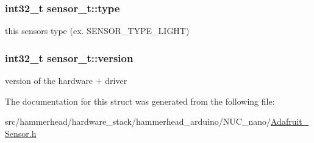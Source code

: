 \subsubsection[{\texorpdfstring{type}{type}}]{\setlength{\rightskip}{0pt plus 5cm}int32\+\_\+t sensor\+\_\+t\+::type}\hypertarget{structsensor__t_ae1d59df64438923d3bd95f2416c32203}{}\label{structsensor__t_ae1d59df64438923d3bd95f2416c32203}
this sensor\textquotesingle{}s type (ex. S\+E\+N\+S\+O\+R\+\_\+\+T\+Y\+P\+E\+\_\+\+L\+I\+G\+HT) 
\subsubsection[{\texorpdfstring{version}{version}}]{\setlength{\rightskip}{0pt plus 5cm}int32\+\_\+t sensor\+\_\+t\+::version}\hypertarget{structsensor__t_a274f12a47669fbd2b61935706339e1c2}{}\label{structsensor__t_a274f12a47669fbd2b61935706339e1c2}
version of the hardware + driver 

The documentation for this struct was generated from the following file\+:\begin{DoxyCompactItemize}
\item 
src/hammerhead/hardware\+\_\+stack/hammerhead\+\_\+arduino/\+N\+U\+C\+\_\+nano/\hyperlink{Adafruit__Sensor_8h}{Adafruit\+\_\+\+Sensor.\+h}\end{DoxyCompactItemize}
